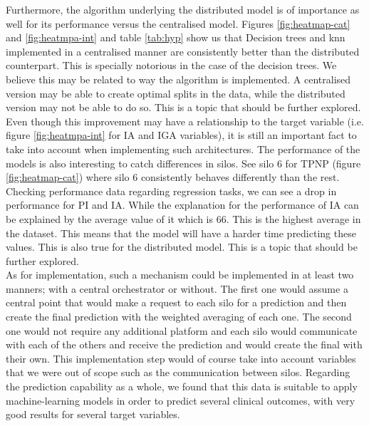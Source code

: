 Furthermore, the algorithm underlying the distributed model is of importance as well for its performance versus the centralised model. Figures \ref{fig:heatmap-cat} and \ref{fig:heatmpa-int} and table \ref{tab:hyp} show us that Decision trees and \ac{knn} implemented in a centralised manner are consistently better than the distributed counterpart. This is specially notorious in the case of the decision trees. We believe this may be related to way the algorithm is implemented. A centralised version may be able to create optimal splits in the data, while the distributed version may not be able to do so. This is a topic that should be further explored.\\
Even though this improvement may have a relationship to the target variable (i.e. figure \ref{fig:heatmpa-int} for IA and IGA variables), it is still an important fact to take into account when implementing such architectures.
The performance of the models is also interesting to catch differences in silos. See silo 6 for TPNP (figure \ref{fig:heatmap-cat}) where silo 6 consistently behaves differently than the rest.
Checking performance data regarding regression tasks, we can see a drop in performance for PI and IA. While the explanation for the performance of IA can be explained by the average value of it which is 66. This is the highest average in the dataset. This means that the model will have a harder time predicting these values. This is also true for the distributed model. This is a topic that should be further explored.\\
As for implementation, such a mechanism could be implemented in at least two manners; with a central orchestrator or without. The first one would assume a central point that would make a request to each silo for a prediction and then create the final prediction with the weighted averaging of each one. The second one would not require any additional platform and each silo would communicate with each of the others and receive the prediction and would create the final with their own. This implementation step would of course take into account variables that we were out of scope such as the communication between silos. 
Regarding the prediction capability as a whole, we found that this data is suitable to apply machine-learning models in order to predict several clinical outcomes, with very good results for several target variables. 

